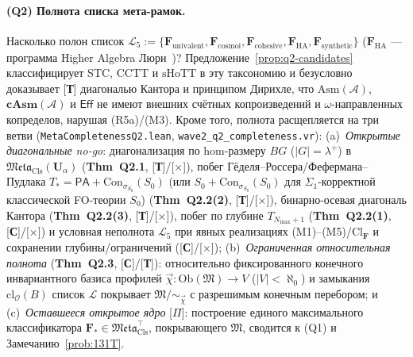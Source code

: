 \documentclass[11pt]{article}
\theoremstyle{plain}
\theoremstyle{definition}
\newcommand{\fM}{\mathfrak{M}}
\newcommand{\Meta}{\mathfrak{Meta}}
\newcommand{\Ob}{\mathrm{Ob}}
\newcommand{\Cl}{\mathrm{Cl}}
\newcommand{\Con}{\mathrm{Con}}
\newcommand{\PA}{\mathsf{PA}}
\newcommand{\Eff}{\ensuremath{\mathsf{Eff}}}
\begin{document}
\paragraph{(Q2) Полнота списка мета-рамок.} Насколько полон список $\mathcal{L}_5 := \{\mathbf{F}_{\mathrm{univalent}},\allowbreak \mathbf{F}_{\mathrm{cosmoi}},\allowbreak \mathbf{F}_{\mathrm{cohesive}},\allowbreak \mathbf{F}_{\mathrm{HA}},\allowbreak \mathbf{F}_{\mathrm{synthetic}}\}$ ($\mathbf{F}_{\mathrm{HA}}$ — программа Higher Algebra Люри~\cite{LurieHA})? Предложение~\ref{prop:q2-candidates} классифицирует STC, CCTT и $\mathrm{sHoTT}$ в эту таксономию и безусловно доказывает \textup{[\textbf{Т}]} диагональю Кантора и принципом Дирихле, что $\mathrm{Asm}(\mathcal{A})$, $\mathbf{cAsm}(\mathcal{A})$ и $\Eff$ не имеют внешних счётных копроизведений и $\omega$-направленных копределов, нарушая (R5a)/(M3). Кроме того, полнота расщепляется на три ветви (\texttt{MetaCompletenessQ2.lean}, \texttt{wave2\_q2\_completeness.vr}): (a)~\emph{Открытые диагональные no-go}: диагонализация по hom-размеру $BG$ ($|G|=\lambda^+$) в $\Meta_{\mathrm{Cls}}(\mathbf{U}_\alpha)$ (\textup{\textbf{Thm~Q2.1}}, \textup{[\textbf{Т}]/[\textbf{$\times$}]}), побег Гёделя--Россера/Фефермана--Пудлака $T_* = \PA + \Con_{\sigma_{S_0}}(S_0)$ (или $S_0 + \Con_{\sigma_{S_0}}(S_0)$ для $\Sigma_1$-корректной классической FO-теории $S_0$) (\textup{\textbf{Thm~Q2.2(2)}}, \textup{[\textbf{Т}]/[\textbf{$\times$}]}), бинарно-осевая диагональ Кантора (\textup{\textbf{Thm~Q2.2(3)}}, \textup{[\textbf{Т}]/[\textbf{$\times$}]}), побег по глубине $T_{N_{\max}+1}$ (\textup{\textbf{Thm~Q2.2(1)}}, \textup{[\textbf{С}]/[\textbf{$\times$}]}) и условная неполнота $\mathcal{L}_5$ при явных реализациях (M1)--(M5)/$\Cl_{\mathbf{F}}$ и сохранении глубины/ограничений (\textup{[\textbf{С}]/[\textbf{$\times$}]}); (b)~\emph{Ограниченная относительная полнота} (\textup{\textbf{Thm~Q2.3}}, \textup{[\textbf{С}]/[\textbf{Т}]}): относительно фиксированного конечного инвариантного базиса профилей $\vec{\chi} : \Ob(\fM) \to V$ ($|V| < \aleph_0$) и замыкания $\mathrm{cl}_{\mathcal{O}}(B)$ список $\mathcal{L}$ покрывает $\fM / {\sim_{\vec{\chi}}}$ с разрешимым конечным перебором; и (c)~\emph{Оставшееся открытое ядро} \textup{[\textbf{$\Pi$}]}: построение единого максимального классификатора $\mathbf{F}_* \in \Meta_{\mathrm{Cls}}^{\top}$, покрывающего $\fM$, сводится к (Q1) и Замечанию~\ref{prob:131T}.
\end{document}
